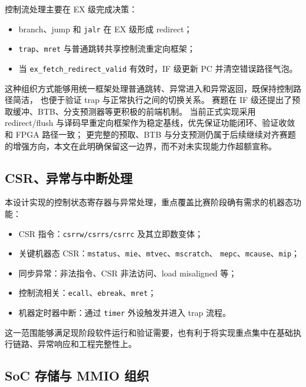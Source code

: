 控制流处理主要在 EX 级完成决策：
\begin{itemize}
    \item branch、jump 和 \texttt{jalr} 在 EX 级形成 redirect；
    \item \texttt{trap}、\texttt{mret} 与普通跳转共享控制流重定向框架；
    \item 当 \texttt{ex\_fetch\_redirect\_valid} 有效时，IF 级更新 PC 并清空错误路径气泡。
\end{itemize}

这种组织方式能够用统一框架处理普通跳转、异常进入和异常返回，既保持控制路径简洁，
也便于验证 trap 与正常执行之间的切换关系。
赛题在 IF 级还提出了预取缓冲、BTB、分支预测器等更积极的前端机制。
当前正式实现采用 redirect/flush 与译码早重定向框架作为稳定基线，优先保证功能闭环、验证收敛和 FPGA 路径一致；
更完整的预取、BTB 与分支预测仍属于后续继续对齐赛题的增强方向，本文在此明确保留这一边界，而不对未实现能力作超额宣称。

\subsection{CSR、异常与中断处理}

本设计实现的控制状态寄存器与异常处理，重点覆盖比赛阶段确有需求的机器态功能：
\begin{itemize}
    \item CSR 指令：\texttt{csrrw/csrrs/csrrc} 及其立即数变体；
    \item 关键机器态 CSR：\texttt{mstatus}、\texttt{mie}、\texttt{mtvec}、\texttt{mscratch}、
    \texttt{mepc}、\texttt{mcause}、\texttt{mip}；
    \item 同步异常：非法指令、CSR 非法访问、load misaligned 等；
    \item 控制流相关：\texttt{ecall}、\texttt{ebreak}、\texttt{mret}；
    \item 机器定时器中断：通过 \texttt{timer} 外设触发并进入 trap 流程。
\end{itemize}

这一范围能够满足现阶段软件运行和验证需要，也有利于将实现重点集中在基础执行链路、异常响应和工程完整性上。

\subsection{SoC 存储与 MMIO 组织}

